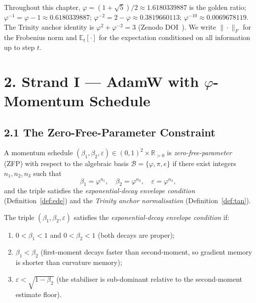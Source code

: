 Throughout this chapter, \(\varphi = (1+\sqrt{5})/2 \approx 1.6180339887\)
is the golden ratio; \(\varphi^{-1} = \varphi - 1 \approx 0.6180339887\);
\(\varphi^{-2} = 2 - \varphi \approx 0.3819660113\);
\(\varphi^{-10} \approx 0.0069678119\).
The Trinity anchor identity is
\(\varphi^2 + \varphi^{-2} = 3\)
(Zenodo DOI~\cite{zenodo_trinity_anchor}).
We write $\|\cdot\|_F$ for the Frobenius norm and
$\mathbb{E}_t[\cdot]$ for the expectation conditioned on all
information up to step $t$.

\section{2. Strand I --- AdamW with \(\varphi\)-Momentum Schedule}
\label{sec:28-strand-I}

\subsection{2.1 The Zero-Free-Parameter Constraint}

\begin{definition}
  \label{def:zfp}
  A momentum schedule \((\beta_1, \beta_2, \varepsilon) \in (0,1)^2 \times \mathbb{R}_{>0}\)
  is \emph{zero-free-parameter} (ZFP) with respect to the algebraic
  basis \(\mathcal{B} = \{\varphi, \pi, e\}\) if there exist integers
  \(n_1, n_2, n_3\) such that
  \[
    \beta_1 = \varphi^{n_1},\quad
    \beta_2 = \varphi^{n_2},\quad
    \varepsilon = \varphi^{n_3},
  \]
  and the triple satisfies the \emph{exponential-decay envelope
  condition} (Definition~\ref{def:ede}) and the \emph{Trinity anchor
  normalisation} (Definition~\ref{def:tan}).
\end{definition}

\begin{definition}
  \label{def:ede}
  The triple \((\beta_1, \beta_2, \varepsilon)\) satisfies the
  \emph{exponential-decay envelope condition} if:
  \begin{enumerate}
    \item $0 < \beta_1 < 1$ and $0 < \beta_2 < 1$ (both decays are proper);
    \item $\beta_1 < \beta_2$ (first-moment decays faster than second-moment,
          so gradient memory is shorter than curvature memory);
    \item $\varepsilon < \sqrt{1 - \beta_2}$ (the stabiliser is
          sub-dominant relative to the second-moment estimate floor).
  \end{enumerate}
\end{definition}

